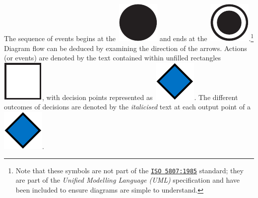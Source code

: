 \begin{preamble}
\begin{itemize}
{The sequence of events begins at the~\includegraphics[height=\fontcharht\font`\d]{figures/ch0-example-start.pdf} and ends at the~\includegraphics[height=\fontcharht\font`\d]{figures/ch0-example-end.pdf}.\footnote{Note that these symbols are not part of the \href{https://www.iso.org/standard/11955.html}{\texttt{ISO 5807:1985}} standard; they are part of the \emph{Unified Modelling Language (UML)} specification and have been included to ensure diagrams are simple to understand.} Diagram flow can be deduced by examining the direction of the arrows. Actions (or events) are denoted by the text contained within unfilled rectangles~\includegraphics[height=\fontcharht\font`\d]{figures/ch0-example-action.pdf}, with decision points represented as~\includegraphics[height=\fontcharht\font`\d]{figures/ch0-example-decision.pdf}. The different outcomes of decisions are denoted by the \emph{italicised} text at each output point of a~\includegraphics[height=\fontcharht\font`\d]{figures/ch0-example-decision.pdf}.}
\end{itemize}





\end{preamble}
